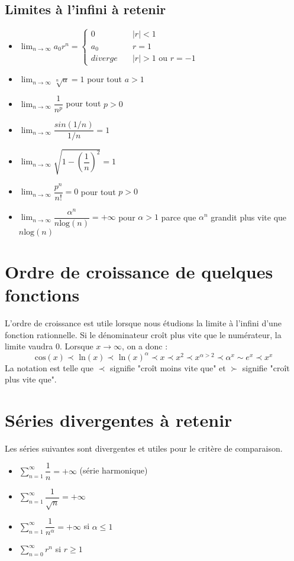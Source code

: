 \documentclass[10pt,a4paper]{book}
\begin{document}
\subsection{Limites à l'infini à retenir}
\begin{itemize}
\item $\lim_{n\to\infty} a_0r^n = \left\{
        \begin{array}{ll}
            0 & \quad |r| < 1\\
            a_0 & \quad r = 1\\
            diverge & \quad |r| > 1 \text{ ou } r = -1
        \end{array}\right.$
\item $\lim_{n\to\infty} \sqrt[n]{a} = 1$ pour tout $a > 1$
\item $\lim_{n\to\infty} \dfrac{1}{n^p}$ pour tout $p > 0$
\item $\lim_{n\to\infty} \dfrac{sin(1/n)}{1/n} = 1$
\item $\lim_{n\to\infty} \sqrt{1-\left(\dfrac{1}{n}\right)^2} = 1$
\item $\lim_{n\to\infty} \dfrac{p^n}{n!} = 0$ pour tout $p > 0$
\item $\lim_{n\to\infty} \dfrac{\alpha^n}{n\text{log}(n)} = +\infty$ pour $\alpha>1$ parce que $\alpha^n$ grandit plus vite que $n\text{log}(n)$
\end{itemize}

\section{Ordre de croissance de quelques fonctions}
L'ordre de croissance est utile lorsque nous étudions la limite à l'infini d'une fonction rationnelle. Si le dénominateur croît plus vite que le numérateur, la limite vaudra 0. Lorsque $x\to\infty$, on a donc :
\[\text{cos}(x)\prec\text{ ln}(x)\prec\text{ ln}(x)^\alpha\prec x\prec x^2\prec x^{\alpha>2}\prec \alpha^x\sim e^x\prec x^x\]
La notation est telle que $\prec$ signifie "croît moins vite que" et $\succ$ signifie "croît plus vite que".

\section{Séries divergentes à retenir}
Les séries suivantes sont divergentes et utiles pour le critère de comparaison.
\begin{itemize}
\item $\sum_{n=1}^\infty \dfrac{1}{n} = +\infty$ (série harmonique)
\item $\sum_{n=1}^\infty \dfrac{1}{\sqrt{n}} = +\infty$
\item $\sum_{n=1}^\infty \dfrac{1}{n^\alpha} = +\infty$ si $\alpha\leq 1$
\item $\sum_{n=0}^\infty r^n$ si $r\geq 1$
\end{itemize}
\end{document}
